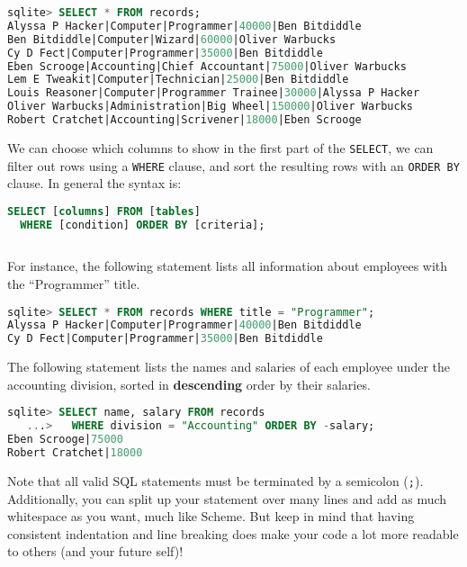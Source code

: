 \begin{lstlisting}[language=SQL]
sqlite> SELECT * FROM records;
Alyssa P Hacker|Computer|Programmer|40000|Ben Bitdiddle
Ben Bitdiddle|Computer|Wizard|60000|Oliver Warbucks
Cy D Fect|Computer|Programmer|35000|Ben Bitdiddle
Eben Scrooge|Accounting|Chief Accountant|75000|Oliver Warbucks
Lem E Tweakit|Computer|Technician|25000|Ben Bitdiddle
Louis Reasoner|Computer|Programmer Trainee|30000|Alyssa P Hacker
Oliver Warbucks|Administration|Big Wheel|150000|Oliver Warbucks
Robert Cratchet|Accounting|Scrivener|18000|Eben Scrooge

\end{lstlisting}

\vspace{20}
We can choose which columns to show in the first part of the \texttt{SELECT}, we
can filter out rows using a \texttt{WHERE} clause, and sort the resulting rows
with an \texttt{ORDER BY} clause. In general the syntax is:

\begin{lstlisting}[language=SQL]
SELECT [columns] FROM [tables]
  WHERE [condition] ORDER BY [criteria];
  
\end{lstlisting}

\vspace{20}
For instance, the following statement lists all information about employees with
the ``Programmer'' title.

\begin{lstlisting}[language=SQL]
sqlite> SELECT * FROM records WHERE title = "Programmer";
Alyssa P Hacker|Computer|Programmer|40000|Ben Bitdiddle
Cy D Fect|Computer|Programmer|35000|Ben Bitdiddle

\end{lstlisting}

\vspace{20}
The following statement lists the names and salaries of each employee under the
accounting division, sorted in \textbf{descending} order by their salaries.

\begin{lstlisting}[language=SQL]
sqlite> SELECT name, salary FROM records
   ...>   WHERE division = "Accounting" ORDER BY -salary;
Eben Scrooge|75000
Robert Cratchet|18000

\end{lstlisting}

\vspace{20}
Note that all valid SQL statements must be terminated by a semicolon
(\texttt{;}). Additionally, you can split up your statement over many lines and
add as much whitespace as you want, much like Scheme. But keep in mind that
having consistent indentation and line breaking does make your code a lot more
readable to others (and your future self)!

